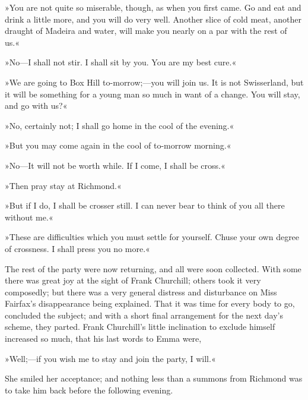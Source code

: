 »You are not quite so miserable, though, as when you first came. Go and eat and drink a little more, and you will do very well. Another slice of cold meat, another draught of Madeira and water, will make you nearly on a par with the rest of us.«

»No—I shall not stir. I shall sit by you. You are my best cure.«

»We are going to Box Hill to-morrow;—you will join us. It is not Swisserland, but it will be something for a young man so much in want of a change. You will stay, and go with us?«

»No, certainly not; I shall go home in the cool of the evening.«

»But you may come again in the cool of to-morrow morning.«

»No—It will not be worth while. If I come, I shall be cross.«

»Then pray stay at Richmond.«

»But if I do, I shall be crosser still. I can never bear to think of you all there without me.«

»These are difficulties which you must settle for yourself. Chuse your own degree of crossness. I shall press you no more.«

The rest of the party were now returning, and all were soon collected. With some there was great joy at the sight of Frank Churchill; others took it very composedly; but there was a very general distress and disturbance on Miss Fairfax's disappearance being explained. That it was time for every body to go, concluded the subject; and with a short final arrangement for the next day's scheme, they parted. Frank Churchill's little inclination to exclude himself increased so much, that his last words to Emma were,

»Well;—if you wish me to stay and join the party, I will.«

She smiled her acceptance; and nothing less than a summons from Richmond was to take him back before the following evening.